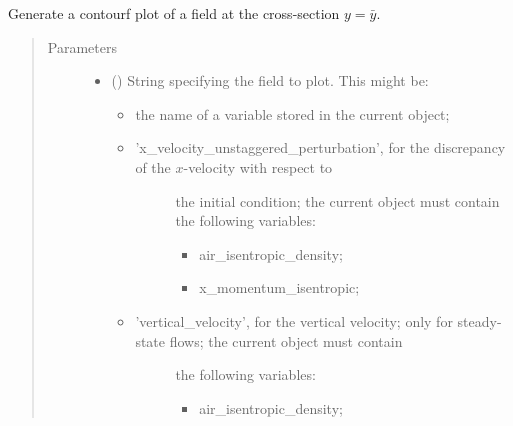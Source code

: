 \documentclass[letterpaper,10pt,english]{sphinxmanual}
\begin{document}
\begin{fulllineitems}
\begin{fulllineitems}
\begin{quote}
\begin{description}
\end{description}\end{quote}

\end{fulllineitems}


\begin{fulllineitems}
\label{\detokenize{api:storages.state_isentropic.StateIsentropic.contourf_xz}}
Generate a contourf plot of a field at the cross-section \(y = \bar{y}\).
\begin{quote}\begin{description}
\item[{Parameters}] \leavevmode\begin{itemize}
\item {} 
 () \textendash{} 
String specifying the field to plot. This might be:
\begin{itemize}
\item {} 
the name of a variable stored in the current object;

\item {} \begin{description}
\item[{’x\_velocity\_unstaggered\_perturbation’, for the discrepancy of the \(x\)-velocity with respect to}] \leavevmode
the initial condition; the current object must contain the following variables:
\begin{itemize}
\item {} 
air\_isentropic\_density;

\item {} 
x\_momentum\_isentropic;

\end{itemize}

\end{description}

\item {} \begin{description}
\item[{’vertical\_velocity’, for the vertical velocity; only for steady-state flows; the current object must contain}] \leavevmode
the following variables:
\begin{itemize}
\item {} 
air\_isentropic\_density;


\end{itemize}
\end{description}
\end{itemize}
\end{itemize}
\end{description}
\end{quote}
\end{fulllineitems}
\end{fulllineitems}
\end{document}

